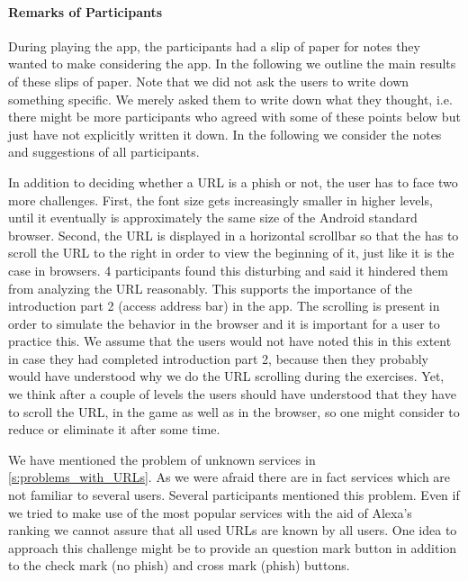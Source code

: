 \paragraph{Remarks of Participants}
\label{s:remarks_of_participants}
During playing the app, the participants had a slip of paper for notes they wanted to make considering the app.
In the following we outline the main results of these slips of paper.
Note that we did not ask the users to write down something specific. 
We merely asked them to write down what they thought, i.e. there might be more participants who agreed with some of these points below but just have not explicitly written it down.
In the following we consider the notes and suggestions of all participants. 
\begin{description}[leftmargin=0cm]	
	\item[Scrolling of URL:] In addition to deciding whether a URL is a phish or not, the user has to face two more challenges. 
First, the font size gets increasingly smaller in higher levels, until it eventually is approximately the same size of the Android standard browser.
Second, the URL is displayed in a horizontal scrollbar so that the has to scroll the URL to the right in order to view the beginning of it, just like it is the case in browsers.
4 participants found this disturbing and said it hindered them from analyzing the URL reasonably. 
This supports the importance of the introduction part 2 (access address bar) in the app.
The scrolling is present in order to simulate the behavior in the browser and it is important for a user to practice this.
We assume that the users would not have noted this in this extent in case they had completed introduction part 2, because then they probably would have understood why we do the URL scrolling during the exercises.
Yet, we think after a couple of levels the users should have understood that they have to scroll the URL, in the game as well as in the browser, so one might consider to reduce or eliminate it after some time. 
	\item[Unknown Services:] We have mentioned the problem of unknown services in \autoref{s:problems_with_URLs}.
As we were afraid there are in fact services which are not familiar to several users.
Several participants mentioned this problem.
Even if we tried to make use of the most popular services with the aid of Alexa's~\cite{alexa} ranking we cannot assure that all used URLs are known by all users.
One idea to approach this challenge might be to provide an question mark button in addition to the check mark (no phish) and cross mark (phish) buttons. 

\end{description}
